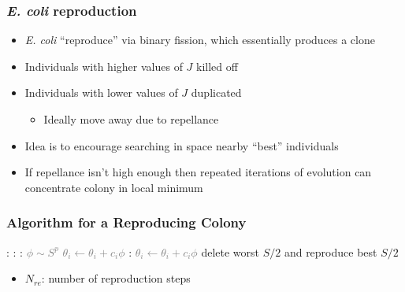 \documentclass{beamer}
\begin{document}
\begin{frame}
\frametitle{\textit{E. coli} reproduction}
\begin{itemize}
  \item<1-> \textit{E. coli} ``reproduce'' via binary fission, which essentially produces a clone
  \item<2-> Individuals with higher values of $J$ killed off
  \item<3-> Individuals with lower values of $J$ duplicated
  \begin{itemize}
    \item<3-> Ideally move away due to repellance
  \end{itemize}
  \item<4-> Idea is to encourage searching in space nearby ``best'' individuals
  \item<5-> \alert{If repellance isn't high enough then repeated iterations of evolution can concentrate colony in local minimum}
\end{itemize}
\end{frame}

\begin{frame}
\frametitle{Algorithm for a Reproducing Colony}
\begin{algorithmic}[1]
:
  \For {\textcolor{gray}{$j \gets 1 \dots N_c $}}:
    \For {\textcolor{gray}{$i \gets 1 \dots S$}}:
      \State \textcolor{gray}{$\phi \sim S^p$}
      \State \textcolor{gray}{$\theta_i \gets \theta_i + c_i \phi$}
      :
        \State \textcolor{gray}{$\theta_i \gets \theta_i + c_i \phi$}
      \EndWhile
    \EndFor
  \EndFor
  \State delete worst $S/2$ and reproduce best $S/2$
\EndFor
\end{algorithmic}
\begin{itemize}
  \item $N_{re}$: number of reproduction steps
\end{itemize}
\end{frame}
\end{document}

